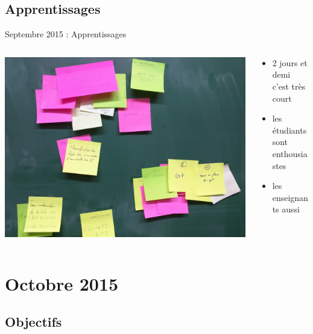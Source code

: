 \documentclass{beamer}
\begin{document}
\subsection{Apprentissages}
\begin{frame}{Septembre 2015 : Apprentissages}
  \begin{columns}
    \begin{column}{0.5\textwidth}
      \begin{center}
        \includegraphics[width=\textwidth]{includes/201509_retro.jpg}      
      \end{center}
    \end{column}
    \begin{column}{0.5\textwidth}
  \begin{itemize}
    \item 2 jours et demi c'est très court
    \item les étudiants sont enthousiastes
    \item les enseignants aussi
  \end{itemize}
    \end{column}
  \end{columns}
\end{frame}

\section{Octobre 2015}
\subsection{Objectifs}
\end{document}
